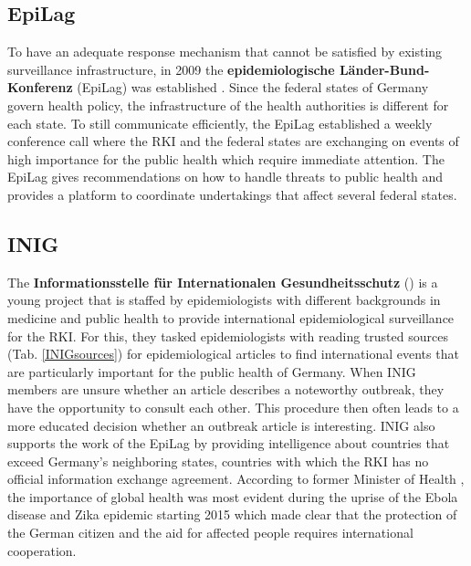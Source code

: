 \subsection{EpiLag}
  To have an adequate response mechanism that cannot be satisfied by existing surveillance infrastructure, in 2009 the \textbf{epidemiologische L\"ander-Bund-Konferenz} (\gls{EpiLag}) was established \citep{Mohr2010}.
  Since the federal states of Germany govern health policy, the infrastructure of the health authorities is different for each state.
  To still communicate efficiently, the EpiLag established a weekly conference call where the RKI and the federal states are exchanging on events of high importance for the public health which require immediate attention.
  The EpiLag gives recommendations on how to handle threats to public health and provides a platform to coordinate undertakings that affect several federal states.

\subsection{INIG}
  The \textbf{Informationsstelle für Internationalen Gesundheitsschutz} () is a young project that is staffed by epidemiologists with different backgrounds in medicine and public health to provide international epidemiological surveillance for the RKI.
  For this, they tasked epidemiologists with reading trusted sources (Tab. \ref{INIGsources}) for epidemiological articles to find international events that are particularly important for the public health of Germany.
  When INIG members are unsure whether an article describes a noteworthy outbreak, they have the opportunity to consult each other.
  This procedure then often leads to a more educated decision whether an outbreak article is interesting.
  INIG also supports the work of the EpiLag by providing intelligence about countries that exceed Germany's neighboring states, countries with which the RKI has no official information exchange agreement.
  According to former Minister of Health \citeauthor{Grohe2017}, the importance of global health was most evident during the uprise of the Ebola disease and Zika epidemic starting 2015 which made clear that the protection of the German citizen and the aid for affected people requires international cooperation.


